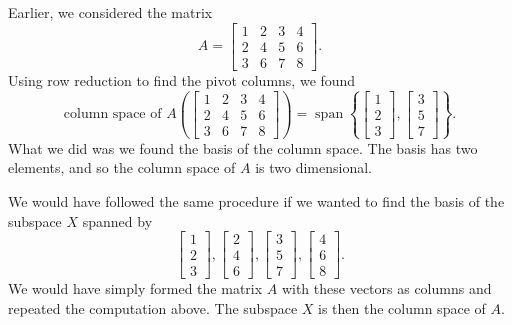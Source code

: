 \begin{example}
Earlier, we considered the matrix
\begin{equation*}
A =
\begin{bmatrix}
1 & 2 & 3 & 4 \\
2 & 4 & 5 & 6 \\
3 & 6 & 7 & 8
\end{bmatrix} .
\end{equation*}
Using row reduction to find the pivot columns, we found
\begin{equation*}
\text{column space of $A$} \left(
\begin{bmatrix}
1 & 2 & 3 & 4 \\
2 & 4 & 5 & 6 \\
3 & 6 & 7 & 8
\end{bmatrix} 
\right)
=
\operatorname{span}
\left\{
\begin{bmatrix}
1 \\
2 \\
3 
\end{bmatrix} 
,
\begin{bmatrix}
3 \\
5 \\
7 
\end{bmatrix} 
\right\} .
\end{equation*}
What we did was we found the basis of the column space.
The basis has two elements, and so the column space of $A$ is two dimensional.
\end{example}

We would have followed the same procedure if we wanted to find the basis of
the subspace $X$ spanned by
\begin{equation*}
\begin{bmatrix}
1 \\
2 \\
3 
\end{bmatrix} 
,
\begin{bmatrix}
2 \\
4 \\
6 
\end{bmatrix} 
,
\begin{bmatrix}
3 \\
5 \\
7 
\end{bmatrix} 
,
\begin{bmatrix}
4 \\
6 \\
8 
\end{bmatrix}
.
\end{equation*}
We would have simply formed the matrix $A$ with these vectors as columns
and repeated the computation above.  The subspace $X$ is then the column space of
$A$.

